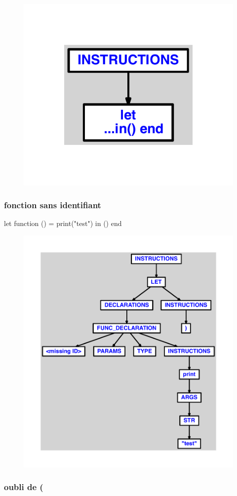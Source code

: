 \documentclass{article}
\begin{document}
\begin{figure}[H]\centering\includegraphics[max width=\textwidth]{ast/ast_205.pdf}\end{figure}\subsubsection{fonction sans identifiant}
\begin{verbatimtab}
let
	function () = print("test")
in () end
\end{verbatimtab}
\begin{figure}[H]\centering\includegraphics[max width=\textwidth]{ast/ast_206.pdf}\end{figure}\subsubsection{oubli de (}
\end{document}
